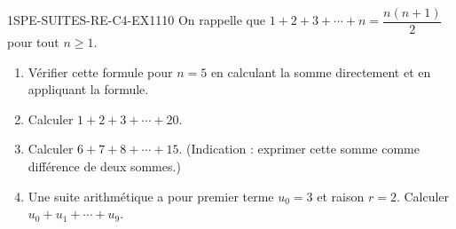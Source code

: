 


\begin{exercice}{1SPE-SUITES-RE-C4-EX1}{1}{10}
On rappelle que $1 + 2 + 3 + \cdots + n = \dfrac{n(n+1)}{2}$ pour tout $n \geq 1$.
\begin{enumerate}
  \item Vérifier cette formule pour $n = 5$ en calculant la somme directement et en appliquant la formule.
  \item Calculer $1 + 2 + 3 + \cdots + 20$.
  \item Calculer $6 + 7 + 8 + \cdots + 15$. (Indication : exprimer cette somme comme différence de deux sommes.)
  \item Une suite arithmétique a pour premier terme $u_0 = 3$ et raison $r = 2$. Calculer $u_0 + u_1 + \cdots + u_9$.
\end{enumerate}
\end{exercice}


